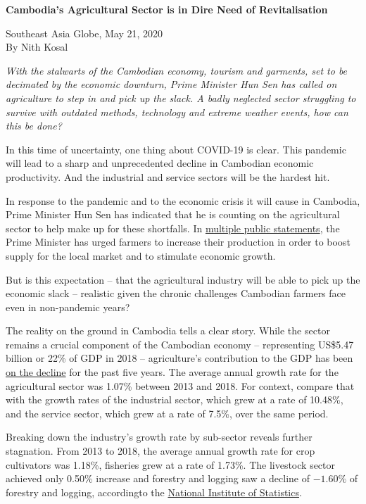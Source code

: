 \documentclass[10pt,a4paper]{letter}
\begin{document}
	
{\Large 
	\textbf{Cambodia's Agricultural Sector is in Dire Need of Revitalisation}
}

Southeast Asia Globe, May 21, 2020\\
By Nith Kosal

\textit{With the stalwarts of the Cambodian economy, tourism and garments, set to be decimated by the economic downturn, Prime Minister Hun Sen has called on agriculture to step in and pick up the slack. A badly neglected sector struggling to survive with outdated methods, technology and extreme weather events, how can this be done?}

In this time of uncertainty, one thing about COVID-19 is clear. This pandemic will lead to a sharp and unprecedented decline in Cambodian economic productivity. And the industrial and service sectors will be the hardest hit.

In response to the pandemic and to the economic crisis it will cause in Cambodia, Prime Minister Hun Sen has indicated that he is counting on the agricultural sector to help make up for these shortfalls. In \href{https://www.khmertimeskh.com/711072/agriculture-needs-to-grow-says-premier/}{multiple public statements}, the Prime Minister has urged farmers to increase their production in order to boost supply for the local market and to stimulate economic growth.

But is this expectation -- that the agricultural industry will be able to pick up the economic slack -- realistic given the chronic challenges Cambodian farmers face even in non-pandemic years?

The reality on the ground in Cambodia tells a clear story. While the sector remains a crucial component of the Cambodian economy -- representing US\$5.47 billion or 22\% of GDP in 2018 -- agriculture's contribution to the GDP has been \href{https://www.nis.gov.kh/nis/NA/NA2018_Tab_files/TAB1-2.htm}{on the decline} for the past five years. The average annual growth rate for the agricultural sector was 1.07\% between 2013 and 2018. For context, compare that with the growth rates of the industrial sector, which grew at a rate of 10.48\%, and the service sector, which grew at a rate of 7.5\%, over the same period.

Breaking down the industry's growth rate by sub-sector reveals further stagnation. From 2013 to 2018, the average annual growth rate for crop cultivators was 1.18\%, fisheries grew at a rate of 1.73\%. The livestock sector achieved only 0.50\% increase and forestry and logging saw a decline of $-1.60\%$ of forestry and logging, accordingto the \href{https://www.nis.gov.kh/nis/NA/NA2018_Tab_files/TAB1-2.htm}{National Institute of Statistics}.
\end{document}
